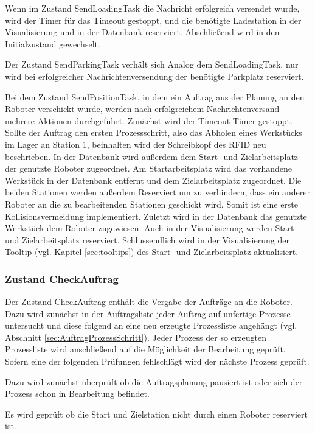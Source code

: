 Wenn im Zustand SendLoadingTask die Nachricht erfolgreich versendet wurde, wird der Timer für das Timeout gestoppt, und die benötigte Ladestation in der Visualisierung und in der Datenbank reserviert. Abschließend wird in den Initialzustand gewechselt.

Der Zustand SendParkingTask verhält sich Analog dem SendLoadingTask, nur wird bei erfolgreicher Nachrichtenversendung der benötigte Parkplatz reserviert.

Bei dem Zustand SendPositionTask, in dem ein Auftrag aus der Planung an den Roboter verschickt wurde, werden nach erfolgreichem Nachrichtenversand mehrere Aktionen durchgeführt. Zunächst wird der Timeout-Timer gestoppt. Sollte der Auftrag den ersten Prozessschritt, also das Abholen eines Werkstücks im Lager an Station 1, beinhalten wird der Schreibkopf des RFID neu beschrieben. In der Datenbank wird außerdem dem Start- und Zielarbeitsplatz der genutzte Roboter zugeordnet. Am Startarbeitsplatz wird das vorhandene Werkstück in der Datenbank entfernt und dem Zielarbeitsplatz zugeordnet. Die beiden Stationen werden außerdem Reserviert um zu verhindern, dass ein anderer Roboter an die zu bearbeitenden Stationen geschickt wird. Somit ist eine erste Kollisionsvermeidung implementiert. Zuletzt wird in der Datenbank das genutzte Werkstück dem Roboter zugewiesen. Auch in der Visualisierung werden Start- und Zielarbeitsplatz reserviert. Schlussendlich wird in der Visualisierung der Tooltip (vgl. Kapitel \ref{sec:tooltips}) des Start- und Zielarbeitsplatz aktualisiert.

\subsubsection{Zustand CheckAuftrag}

Der Zustand CheckAuftrag enthält die Vergabe der Aufträge an die Roboter. 
Dazu wird zunächst in der Auftragsliste jeder Auftrag auf unfertige Prozesse untersucht und diese folgend an eine neu erzeugte Prozessliste angehängt (vgl. Abschnitt \ref{sec:AuftragProzessSchritt}). Jeder Prozess der so erzeugten Prozessliste wird anschließend auf die Möglichkeit der Bearbeitung geprüft. Sofern eine der folgenden Prüfungen fehlschlägt wird der nächste Prozess geprüft.

Dazu wird zunächst überprüft ob die Auftragsplanung pausiert ist oder sich der Prozess schon in Bearbeitung befindet. 

Es wird geprüft ob die Start und Zielstation nicht durch einen Roboter reserviert ist.

